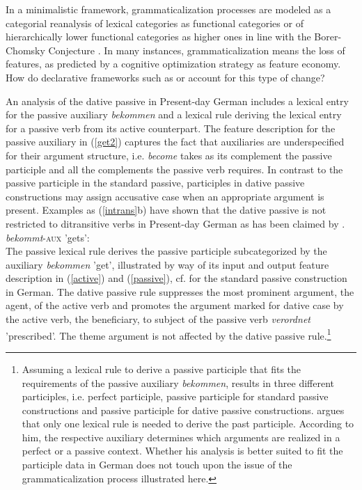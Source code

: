 \documentclass[output=paper]{langsci/langscibook}
\begin{document}
In a minimalistic framework, grammaticalization processes are modeled as a categorial reanalysis of lexical categories as functional categories or of hierarchically lower functional categories as higher ones in line with the Borer-Chomsky Conjecture \citep{RobRou2003}. In many instances, grammaticalization means the loss of features, as predicted by a cognitive optimization strategy as feature economy. How do declarative frameworks such as \lfg or \hpsg account for this type of change? 

An \hpsg analysis of the dative passive in Present-day German includes a lexical entry for the passive auxiliary \textit{bekommen} and a lexical rule deriving the lexical entry for a passive verb from its active counterpart. The feature description for the passive auxiliary in (\ref{get2}) captures the fact that auxiliaries are underspecified for their argument structure, i.e. \textit{become} takes as its complement the passive participle and all the complements the passive verb requires. In contrast to the passive participle in the standard passive, participles in dative passive constructions may assign accusative case when an appropriate argument is present. Examples as (\ref{intrans}b) have shown that the dative passive is not restricted to ditransitive verbs in Present-day German as has been claimed by \cite{KoNo2009}.
\ea \label{get2}
\textit{bekommt}-\textsc{aux} 'gets': \\
\z 
The passive lexical rule derives the passive participle subcategorized by the auxiliary \textit{bekommen} 'get', illustrated by way of its input and output feature description in (\ref{active}) and (\ref{passive}), cf. \cite[285]{MuellerGT-Eng2} for the standard passive construction in German. The dative passive rule suppresses the most prominent argument, the agent, of the active verb and promotes the argument marked for dative case by the active verb, the beneficiary, to subject of the passive verb \textit{verordnet} 'prescribed'. The theme argument is not affected by the dative passive rule.\footnote{Assuming a  lexical rule to derive a passive participle that fits the requirements of the passive auxiliary \textit{bekommen}, results in three different participles, i.e. perfect participle, passive participle for standard passive constructions and passive participle for dative passive constructions. \cite{MuellerGT-Eng2} argues that only one lexical rule is needed to derive the past participle. According to him, the respective auxiliary determines which arguments are realized in a perfect or a passive context. Whether his analysis is better suited to fit the participle data in German does not touch upon the issue of the grammaticalization process illustrated here.}
\end{document}
